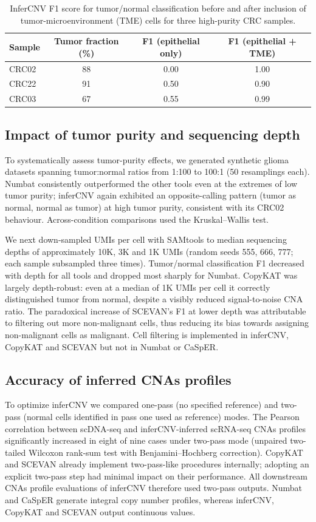 \documentclass[11pt]{article}
\begin{document}
\begin{table}[ht]
\centering
\caption{InferCNV F1 score for tumor/normal classification before and after inclusion of tumor-microenvironment (TME) cells for three high-purity CRC samples.}
\label{tab:tme_f1}
\begin{tabular}{lccc}
\toprule
Sample & Tumor fraction (\%) & F1 (epithelial only) & F1 (epithelial + TME) \\
\midrule
CRC02 & 88 & 0.00 & 1.00 \\
CRC22 & 91 & 0.50 & 0.90 \\
CRC03 & 67 & 0.55 & 0.99 \\
\bottomrule
\end{tabular}
\end{table}

\subsection{Impact of tumor purity and sequencing depth}
To systematically assess tumor-purity effects, we generated synthetic glioma datasets spanning tumor:normal ratios from 1:100 to 100:1 (50 resamplings each). Numbat consistently outperformed the other tools even at the extremes of low tumor purity; inferCNV again exhibited an opposite-calling pattern (tumor as normal, normal as tumor) at high tumor purity, consistent with its CRC02 behaviour. Across-condition comparisons used the Kruskal--Wallis test.

We next down-sampled UMIs per cell with SAMtools to median sequencing depths of approximately 10K, 3K and 1K UMIs (random seeds 555, 666, 777; each sample subsampled three times). Tumor/normal classification F1 decreased with depth for all tools and dropped most sharply for Numbat. CopyKAT was largely depth-robust: even at a median of 1K UMIs per cell it correctly distinguished tumor from normal, despite a visibly reduced signal-to-noise CNA ratio. The paradoxical increase of SCEVAN's F1 at lower depth was attributable to filtering out more non-malignant cells, thus reducing its bias towards assigning non-malignant cells as malignant. Cell filtering is implemented in inferCNV, CopyKAT and SCEVAN but not in Numbat or CaSpER.

\subsection{Accuracy of inferred CNAs profiles}
To optimize inferCNV we compared one-pass (no specified reference) and two-pass (normal cells identified in pass one used as reference) modes. The Pearson correlation between scDNA-seq and inferCNV-inferred scRNA-seq CNAs profiles significantly increased in eight of nine cases under two-pass mode (unpaired two-tailed Wilcoxon rank-sum test with Benjamini--Hochberg correction). CopyKAT and SCEVAN already implement two-pass-like procedures internally; adopting an explicit two-pass step had minimal impact on their performance. All downstream CNAs profile evaluations of inferCNV therefore used two-pass outputs. Numbat and CaSpER generate integral copy number profiles, whereas inferCNV, CopyKAT and SCEVAN output continuous values.
\end{document}
